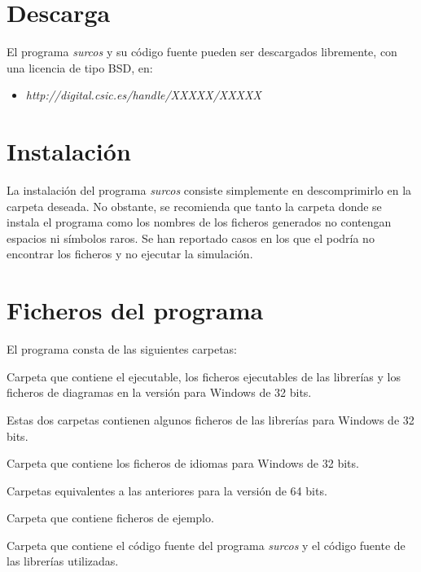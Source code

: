 \section{Descarga}

El programa \emph{surcos} y su código fuente pueden ser descargados libremente,
con una licencia de tipo BSD, en:
\begin{itemize}
\item \textit{http://digital.csic.es/handle/XXXXX/XXXXX}
\end{itemize}

\section{Instalación}

La instalación del programa \emph{surcos} consiste simplemente en descomprimirlo
en la carpeta deseada. No obstante, se recomienda que tanto la carpeta donde se
instala el programa como los nombres de los ficheros generados no contengan
espacios ni símbolos raros. Se han reportado casos en los que el podría no
encontrar los ficheros y no ejecutar la simulación.

\section{Ficheros del programa}

El programa consta de las siguientes carpetas:
\begin{description}
\item[win32/bin]
\item Carpeta que contiene el ejecutable, los ficheros ejecutables de las
librerías y los ficheros de diagramas en la versión para Windows de 32 bits.
\item[win32/etc]
\item[win32/lib]
\item Estas dos carpetas contienen algunos ficheros de las librerías para
Windows de 32 bits.
\item[win32/share]
\item Carpeta que contiene los ficheros de idiomas para Windows de 32 bits.
\item[win64/bin]
\item[win64/etc]
\item[win64/lib]
\item[win64/share]
\item Carpetas equivalentes a las anteriores para la versión de 64 bits.
\item[examples]
\item Carpeta que contiene ficheros de ejemplo.
\item[src]
\item Carpeta que contiene el código fuente del programa \emph{surcos} y el
código fuente de las librerías utilizadas.
\end{description}

